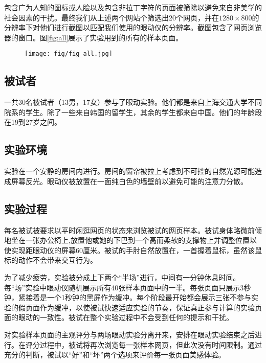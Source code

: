 包含广为人知的图标或人脸以及包含非拉丁字符的页面被筛除以避免来自非美学的社会因素的干扰。最终我们从上述两个网站个筛选出20个网页，并在$1280\times800$的分辨率下对他们进行截图以匹配我们使用的眼动仪的分辨率。截图包含了网页浏览器的窗口。图\ref{fig:all}展示了实验用到的所有的样本页面。

\begin{figure}
  \centering
  \texttt{[image: fig/fig\_all.jpg]}
\end{figure}

\subsection{被试者}
一共30名被试者（13男，17女）参与了眼动实验。他们都是来自上海交通大学不同院系的学生。除了一些来自韩国的留学生，其余的学生都来自中国。他们的年龄段在19到27岁之间。

\subsection{实验环境}
实验在一个安静的房间内进行。房间的窗帘被拉上考虑到不可控的自然光源可能造成屏幕反光。眼动仪被放置在一面纯白色的墙壁前以避免可能的注意力分散。

\subsection{实验过程}
每名被试被要求以平时闲逛网页的状态来浏览被试的网页样本。被试身体略微前倾地坐在一张办公椅上,放置他或她的下巴到一个高而柔软的支撑物上并调整位置以使实现距眼动仪的屏幕60厘米。被试的手肘自然放置在，一首握着鼠标，虽然该鼠标的动作不会带来交互行为。

为了减少疲劳，实验被分成上下两个“半场”进行，中间有一分钟休息时间。每“场”实验中眼动仪随机展示所有40张样本页面中的一半。每张页面只展示3秒钟，紧接着是一个1秒钟的黑屏作为缓冲。每个阶段最开始都会展示三张不参与实验的假页面作为缓冲，以使被试快速适应实验的节奏，保证真正参与计算的实验页面的眼动的一致性。被试在整个实验过程中不会受到任何的提示和干扰。

对实验样本页面的主观评分与两场眼动实验分离开来，安排在眼动实验结束之后进行。在评分过程中，被试将再次浏览每一张样本网页，但此次没有时间限制。通过充分的判断，被试以“好”和“坏”两个选项来评价每一张页面美感体验。

